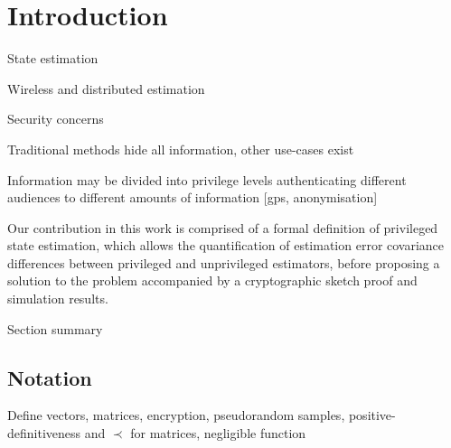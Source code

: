 \documentclass[conference]{IEEEtran}
\theoremstyle{definition}
\theoremstyle{definition}
\theoremstyle{remark}
\begin{document}

\IEEEpeerreviewmaketitle

% 
%                                                        
%                                                        
%                                                        
% 

\section{Introduction}
State estimation

Wireless and distributed estimation

Security concerns

Traditional methods hide all information, other use-cases exist

Information may be divided into privilege levels authenticating different audiences to different amounts of information [gps, anonymisation]

Our contribution in this work is comprised of a formal definition of privileged state estimation, which allows the quantification of estimation error covariance differences between privileged and unprivileged estimators, before proposing a solution to the problem accompanied by a cryptographic sketch proof and simulation results.

Section summary

\subsection{Notation}
Define vectors, matrices, encryption, pseudorandom samples, positive-definitiveness and $\prec$ for matrices, negligible function


% 
%                                              
%                                              
%                                              
% 
\end{document}
